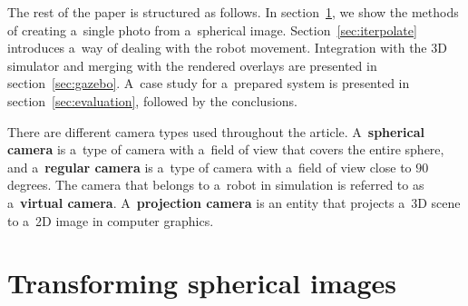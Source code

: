\documentclass{svproc}
\begin{document}
The rest of the paper is structured as follows. In section~\ref{sec:spherical}, we show the methods of creating
a~single photo from a~spherical image. Section~\ref{sec:iterpolate} introduces a~way of dealing with the robot movement.
Integration with the 3D simulator and merging with the rendered overlays are presented in section~\ref{sec:gazebo}.
A~case study for a~prepared system is presented in section~\ref{sec:evaluation}, followed by the conclusions.






There are different camera types used throughout the article. A~\textbf{spherical camera} is a~type of camera with a~field of view that covers the entire sphere, and a~\textbf{regular camera} is a~type of camera with a~field of view close to $90$ degrees.
The camera that belongs to a~robot in simulation is referred to as a~\textbf{virtual camera}.
A~\textbf{projection camera} is an entity that projects a~3D scene to a~2D image in computer graphics.


\section{Transforming spherical images}
\label{sec:spherical}
\end{document}
